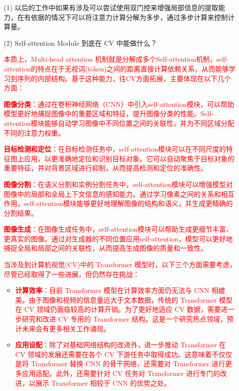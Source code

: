 \documentclass[letterpaper,10pt]{article}
\begin{document}
	\begin{itemize}
		\item [(1)] 以后的工作中如果有涉及可以尝试使用双门控来增强局部信息的提取能力，在有依据的情况下可以将注意力计算分解为多步，通过多步计算来控制计算量。
		
		\item [(2)] Self-attention Module 到底在 CV 中能做什么？
		
		\textcolor{red}{本质上，Multi-head attention 机制就是分解成多个Self-attention机制，self-attention的特点在于无视词(token)之间的距离直接计算依赖关系，从而能够学习到序列的内部结构。基于这种能力，往CV方面拓展，主要体现在以下几个方面：}
		
		\textcolor{red}{\textbf{图像分类}：通过在卷积神经网络（CNN）中引入self-attention模块，可以帮助模型更好地捕捉图像中的重要区域和特征，提升图像分类的性能。Self-attention模块能够自动学习图像中不同位置之间的关联性，并为不同区域分配不同的注意力权重。}
		
		\textcolor{red}{\textbf{目标检测和定位}：在目标检测任务中，self-attention模块可以在不同尺度的特征图上应用，以更准确地定位和识别目标对象。它可以自动聚焦于目标对象的重要特征，并对背景区域进行抑制，从而提高检测和定位的准确性。}
		
		\textcolor{red}{\textbf{图像分割}：在语义分割和实例分割任务中，self-attention模块可以增强模型对图像中的局部和全局上下文信息的感知能力。通过学习像素之间的关系和相互作用，self-attention模块能够更好地理解图像的结构和语义，并生成更精确的分割结果。}
		
		\textcolor{red}{\textbf{图像生成}：在图像生成任务中，self-attention模块可以帮助生成更细节丰富、更真实的图像。通过对生成器的不同位置应用self-attention，模型可以更好地捕捉全局和局部之间的关联性，从而提高生成图像的质量和一致性。}
		
		\textcolor{red}{当涉及到计算机视觉(CV)中的 Transformer 模型时，以下三个方面需要考虑，尽管已经取得了一些进展，但仍然存在挑战：}
		
		\begin{itemize}
			\item {}
			\textcolor{red}{\textbf{计算效率}：目前 Transformer 模型在计算效率方面仍无法与 CNN 相媲美。由于图像和视频的信息量远大于文本数据，传统的 Transformer 模型在 CV 领域仍面临较高的计算开销。为了更好地适应 CV 数据，需要进一步研究和改进 CV 专用的 Transformer 结构。这是一个研究热点领域，预计未来会有更多相关工作涌现。}
			
			\item {}
			\textcolor{red}{\textbf{应用设配}：除了对基础网络结构的改进外，进一步推动 Transformer 在 CV 领域的发展还需要在各个 CV 下游任务中取得成功。这意味着不仅仅是将 Transformer 替换 CNN 的骨干网络，还需要对 Transformer 进行更多应用适配。此外，还需要针对 CV 任务对 Transformer 进行专门的改进，以展示 Transformer 相较于 CNN 的优势之处。}
			

\end{itemize}
\end{itemize}
\end{document}
